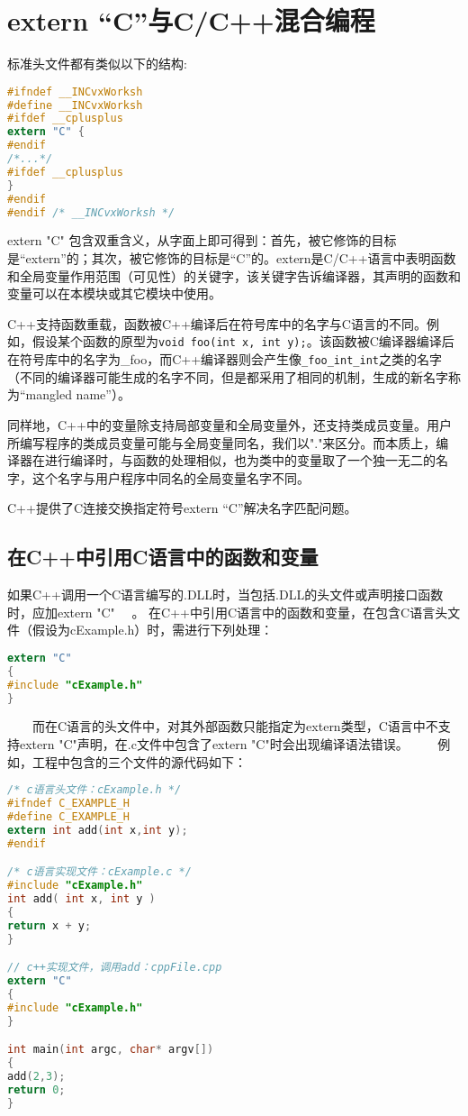 \section{extern “C”与C/C++混合编程}

标准头文件都有类似以下的结构:
\begin{lstlisting}[language=C]
#ifndef __INCvxWorksh
#define __INCvxWorksh 
#ifdef __cplusplus
extern "C" {
#endif 
/*...*/ 
#ifdef __cplusplus
}
#endif 
#endif /* __INCvxWorksh */
\end{lstlisting} 

extern "C" 包含双重含义，从字面上即可得到：首先，被它修饰的目标是“extern”的；其次，被它修饰的目标是“C”的。extern是C/C++语言中表明函数和全局变量作用范围（可见性）的关键字，该关键字告诉编译器，其声明的函数和变量可以在本模块或其它模块中使用。

C++支持函数重载，函数被C++编译后在符号库中的名字与C语言的不同。例如，假设某个函数的原型为\verb|void foo(int x, int y);|。该函数被C编译器编译后在符号库中的名字为\_foo，而C++编译器则会产生像\verb|_foo_int_int|之类的名字（不同的编译器可能生成的名字不同，但是都采用了相同的机制，生成的新名字称为“mangled name”）。

同样地，C++中的变量除支持局部变量和全局变量外，还支持类成员变量。用户所编写程序的类成员变量可能与全局变量同名，我们以"."来区分。而本质上，编译器在进行编译时，与函数的处理相似，也为类中的变量取了一个独一无二的名字，这个名字与用户程序中同名的全局变量名字不同。

C++提供了C连接交换指定符号extern “C”解决名字匹配问题。 

\subsection{在C++中引用C语言中的函数和变量}

如果C++调用一个C语言编写的.DLL时，当包括.DLL的头文件或声明接口函数时，应加extern "C" {　}。
在C++中引用C语言中的函数和变量，在包含C语言头文件（假设为cExample.h）时，需进行下列处理：
\begin{lstlisting}[language=C]
 extern "C"
{
#include "cExample.h"
}

\end{lstlisting} 
　　而在C语言的头文件中，对其外部函数只能指定为extern类型，C语言中不支持extern "C"声明，在.c文件中包含了extern "C"时会出现编译语法错误。
　　例如，工程中包含的三个文件的源代码如下：
\begin{lstlisting}[language=C]
 /* c语言头文件：cExample.h */
#ifndef C_EXAMPLE_H
#define C_EXAMPLE_H
extern int add(int x,int y);
#endif

/* c语言实现文件：cExample.c */
#include "cExample.h"
int add( int x, int y )
{
return x + y;
}

// c++实现文件，调用add：cppFile.cpp
extern "C" 
{
#include "cExample.h"
}

int main(int argc, char* argv[])
{
add(2,3); 
return 0;
}

\end{lstlisting} 


